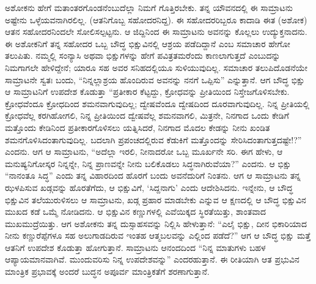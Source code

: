 ಅಶೋಕನು ಹೇಗೆ ಮತಾಂತರಗೊಂಡನೆಂಬುದೆಲ್ಲಾ ನಿಮಗೆ ಗೊತ್ತಿರಬೇಕು. ತನ್ನ ಯೌವನದಲ್ಲಿ ಈ ಸಾಮ್ರಾಟನು ಅಷ್ಟೇನು ಒಳ್ಳೆಯವನಾಗಿರಲಿಲ್ಲ. (ಆತನಿಗೊಬ್ಬ ಸಹೋದರನಿದ್ದ). ಈ ಸಹೋದರರಿಬ್ಬರೂ ಕಾದಾಡಿ ಈತ (ಅಶೋಕ) ಆತನ ಸಹೋದರನಿಂದಲೇ ಸೋಲಿಸಲ್ಪಟ್ಟನು. ಆ ಜಿದ್ದಿನಿಂದ ಈ ಸಾಮ್ರಾಟನು ಅವನನ್ನು ಕೊಲ್ಲಲು ಉದ್ಯುಕ್ತನಾದನು. ಈ ಅಶೋಕನಿಗೆ ತನ್ನ ಸಹೋದರ ಒಬ್ಬ ಬೌದ್ಧ ಭಿಕ್ಷುವಿನಲ್ಲಿ ಆಶ್ರಯ ಪಡೆದಿದ್ದಾನೆ ಎಂಬ ಸಮಾಚಾರ ಹೇಗೋ ತಲುಪಿತು. ನಮ್ಮಲ್ಲಿ ಸಂನ್ಯಾಸಿ ಅಥವಾ ಭಿಕ್ಷುಗಳನ್ನು ಹೇಗೆ ಪವಿತ್ರತಮರೆಂದು ಕಾಣಲಾಗುತ್ತದೆ ಎಂಬುದನ್ನು ನಿಮಗಾಗಲೇ ಹೇಳಿದ್ದೇನೆ; ಯಾರೂ ಸಹ ಅವರ ಸನಿಹದಲ್ಲಿಯೂ ಸುಳಿಯುವುದಿಲ್ಲ. ಸಮಾಚಾರ ತಲುಪಿದೊಡನೆಯೇ ಸಾಮ್ರಾಟನೇ ಸ್ವತಃ ಬಂದು, “ನಿನ್ನಲ್ಲಾಶ್ರಯ ಹೊಂದಿರುವ ಅವನನ್ನು ನನಗೆ ಒಪ್ಪಿಸು” ಎನ್ನುತ್ತಾನೆ. ಆಗ ಬೌದ್ಧ ಭಿಕ್ಷು ಆ ಸಾಮ್ರಾಟನಿಗೆ ಉಪದೇಶ ಕೊಡುತ್ತಾ “ಪ್ರತೀಕಾರ ಕೆಟ್ಟದ್ದು, ಕ್ರೋಧವನ್ನು ಪ್ರೀತಿಯಿಂದ ನಿಸ್ತೇಜಗೊಳಿಸಬೇಕು. ಕ್ರೋಧವೆಂದೂ ಕ್ರೋಧದಿಂದ ಶಮನವಾಗುವುದಿಲ್ಲ; ದ್ವೇಷವೆಂದೂ ದ್ವೇಷದಿಂದ ದೂರವಾಗುವುದಿಲ್ಲ. ನಿನ್ನ ಪ್ರೀತಿಯಲ್ಲಿ ಕ್ರೋಧವೆಲ್ಲ ಕರಗಿಹೋಗಲಿ, ನಿನ್ನ ಪ್ರೀತಿಯಿಂದ ದ್ವೇಷವೆಲ್ಲ ಶಮನವಾಗಲಿ, ಮಿತ್ರನೇ, ನಿನಗಾದ ಒಂದು ಕೇಡಿಗೆ ಮತ್ತೊಂದು ಕೇಡಿನಿಂದ ಪ್ರತೀಕಾರಗೊಳಿಸಲು ಯತ್ನಿಸಿದರೆ, ನಿನಗಾದ ಮೊದಲ ಕೇಡನ್ನು ನೀನು ಖಂಡಿತ ಶಮನಗೊಳಿಸಿದಂತಾಗುವುದಿಲ್ಲ. ಬದಲಾಗಿ ಪ್ರಪಂಚದಲ್ಲಿರುವ ಕೆಡುಕಿಗೆ ಮತ್ತೊಂದನ್ನು ಸೇರಿಸಿದಂತಾಗುತ್ತದಷ್ಟೇ!?” ಎಂದನು. ಆಗ ಆ ಸಾಮ್ರಾಟನು, “ಅದೆಲ್ಲಾ ಇರಲಿ, ನೀನಾದರೋ ಒಬ್ಬ ಮೂರ್ಖನೇ ಸರಿ. ಈಗ ಹೇಳು, ಆ ಮನುಷ್ಯನಿಗೋಸ್ಕರ ನಿನ್ನನ್ನೇ, ನಿನ್ನ ಪ್ರಾಣವನ್ನೇ ನೀನು ಬಲಿಕೊಡಲು ಸಿದ್ಧನಾಗಿರುವೆಯಾ?” ಎಂದನು. ಆ ಭಿಕ್ಷು “ನಾನಂತೂ ಸಿದ್ಧ” ಎಂದು ತನ್ನ ವಿಹಾರದಿಂದ ಹೊರಗೆ ಬಂದು ಅವನೆದುರಿಗೆ ನಿಂತನು. ಆಗ ಆ ಸಾಮ್ರಾಟನು ತನ್ನ ಝಳಪಿಸುವ ಖಡ್ಗವನ್ನು ಹೊರತೆಗೆದು, ಆ ಭಿಕ್ಷುವಿಗೆ, ‘ಸಿದ್ದನಾಗು’ ಎಂದು ಆದೇಶಿಸಿದನು. ಇನ್ನೇನು, ಆ ಬೌದ್ಧ ಭಿಕ್ಷುವಿನ ತಲೆಯುರುಳಿಸಲು ಆ ಸಾಮ್ರಾಟನು, ಖಡ್ಗ ಪ್ರಹಾರ ಮಾಡಬೇಕು ಎನ್ನುವ ಆ ಕ್ಷಣದಲ್ಲಿ ಆ ಬೌದ್ಧ ಭಿಕ್ಷುವಿನ ಮುಖದ ಕಡೆ ಒಮ್ಮೆ ನೋಡಿದನು. ಆ ಭಿಕ್ಷುವಿನ ಕಣ್ಣುಗಳಲ್ಲಿ ಎವೆಯಿಕ್ಕದ ಸ್ಥಿರತೆಯಿತ್ತು, ಶಾಂತವಾದ ಮುಖಮುದ್ರೆಯಿತ್ತು. ಆಗ ಅಶೋಕನು ತನ್ನ ದುಸ್ಸಾಹಸವನ್ನು ನಿಲ್ಲಿಸಿ ಹೇಳುತ್ತಾನೆ: “ಎಲೈ ಭಿಕ್ಷು, ದೀನ ಭಿಕಾರಿಯಾದ ನೀನು ಕಣ್ಣುರೆಪ್ಪೆಗಳೂ ಸಹ ಅಲುಗಾಡದಿರುವ ಇಂತಹ ಆತ್ಮಬಲವನ್ನು ಎಲ್ಲಿಂದ ಪಡೆದೆ?” ಆಗ ಆ ಬೌದ್ಧ ಭಿಕ್ಷು ಮತ್ತೆ ಆತನಿಗೆ ಉಪದೇಶ ಕೊಡುತ್ತಾ ಹೋಗುತ್ತಾನೆ. ಸಾಮ್ರಾಟನು ಆನಂದದಿಂದ “ನಿನ್ನ ಮಾತುಗಳು ಬಹಳ ಆಪ್ಯಾಯಮಾನವಾಗಿವೆ. ಮುಂದುವರಿಸು ನಿನ್ನ ಉಪದೇಶವನ್ನು” ಎಂದರಹುತ್ತಾನೆ. ಈ ರೀತಿಯಾಗಿ ಆತ ಪ್ರಭುವಿನ ಮಾಂತ್ರಿಕ ಪ್ರಭಾವಕ್ಕೆ ಅಂದರೆ ಬುದ್ಧನ ಅಪೂರ್ವ ಮಾಂತ್ರಿಕತೆಗೆ ಶರಣಾಗುತ್ತಾನೆ.


